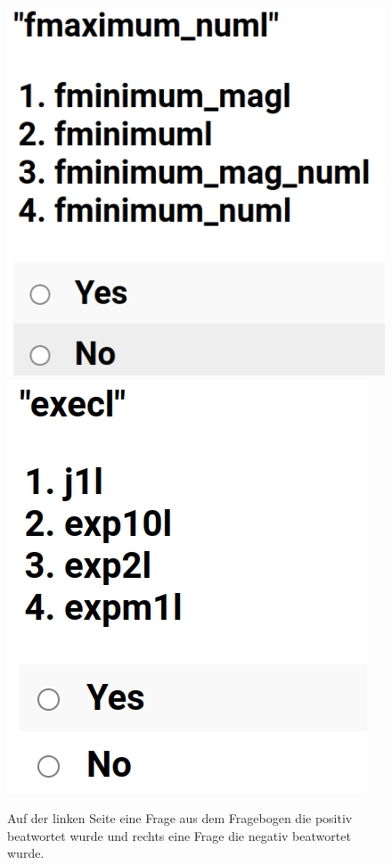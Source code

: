 \documentclass[12pt,letterpaper,ngerman]{article}
\begin{document}
\begin{figure}[H]
  \begin{center}
    \includegraphics[scale=0.3]{abb/survey-example-positive.png}
    \includegraphics[scale=0.3]{abb/survey-example-negative.png}
  \end{center}
  \caption{
    Auf der linken Seite eine Frage aus dem Fragebogen die positiv
    beatwortet wurde und rechts eine Frage die negativ
    beatwortet wurde.
  }
\end{figure}
\end{document}
